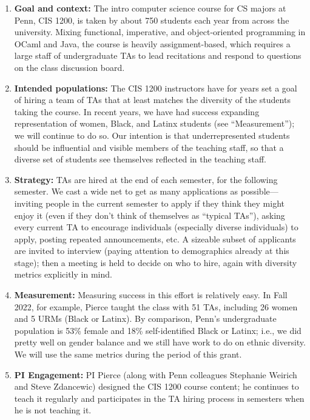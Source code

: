 \begin{enumerate}
\item {\bf Goal and context:} The intro computer science course for CS
majors at Penn, CIS 1200, is taken by about 750 students each year
from across the university.  Mixing functional, imperative, and
object-oriented programming in OCaml and Java, the course is heavily
assignment-based, which requires a large staff of undergraduate TAs to
lead recitations and respond to questions on the class discussion
board.

\item {\bf Intended populations:} The CIS 1200 instructors have for years
set a goal of hiring a team of TAs that at least matches the diversity of the
students taking the course. In recent years, we have had success expanding
representation of women, Black, and Latinx students (see ``Measurement''); we
will continue to do so. Our intention is that underrepresented
students should be
influential and visible members of the teaching staff, so that
a diverse set of students see themselves reflected in the
teaching staff.

\item {\bf Strategy:} TAs are hired at the end of each semester, for
the following semester.  We cast a wide net to get as many
applications as possible---inviting people in the current semester to
apply if they think they might enjoy it (even if they don't think of
themselves as ``typical TAs''), asking every current TA to encourage
individuals (especially diverse individuals) to apply, posting
repeated announcements, etc.  A sizeable subset of applicants are
invited to interview (paying attention to demographics already at this
stage); then a meeting is held to decide on who to hire, again with
diversity metrics explicitly in mind.

\item {\bf Measurement:} Measuring success in this effort is
relatively easy.  In Fall 2022, for example, Pierce taught the class
with 51 TAs, including 26 women and 5 URMs (Black or Latinx).  By
comparison, Penn's undergraduate population is 53\% female and 18\%
self-identified Black or Latinx; i.e., we did pretty well on gender balance
and we still have work to do on ethnic diversity.  We will use the
same metrics during the period of this grant.

\item {\bf PI Engagement:} PI Pierce (along with Penn colleagues
Stephanie Weirich and Steve Zdancewic) designed the CIS 1200 course
content; he continues to teach it regularly and participates in the
TA hiring process in semesters when he is not teaching it.
\end{enumerate}

